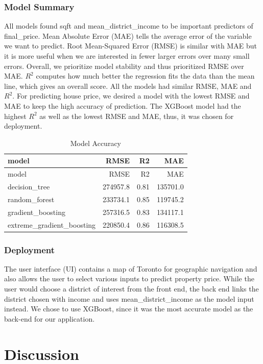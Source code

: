 \documentclass[11pt,]{article}
\begin{document}
\hypertarget{model-summary}{%
\subsubsection{Model Summary}\label{model-summary}}

All models found sqft and mean\_district\_income to be important
predictors of final\_price. Mean Absolute Error (MAE) tells the average
error of the variable we want to predict. Root Mean-Squared Error (RMSE)
is similar with MAE but it is more useful when we are interested in
fewer larger errors over many small errors. Overall, we prioritize model
stability and thus prioritized RMSE over MAE. \(R^2\) computes how much
better the regression fits the data than the mean line, which gives an
overall score. All the models had similar RMSE, MAE and \(R^2\). For
predicting house price, we desired a model with the lowest RMSE and MAE
to keep the high accuracy of prediction. The XGBoost model had the
highest \(R^2\) as well as the lowest RMSE and MAE, thus, it was chosen
for deployment.

\begin{longtable}[]{@{}lrrr@{}}
\caption{Model Accuracy}\tabularnewline
\toprule
model & RMSE & R2 & MAE\tabularnewline
\midrule
\endfirsthead
\toprule
model & RMSE & R2 & MAE\tabularnewline
\midrule
\endhead
decision\_tree & 274957.8 & 0.81 & 135701.0\tabularnewline
random\_forest & 233734.1 & 0.85 & 119745.2\tabularnewline
gradient\_boosting & 257316.5 & 0.83 & 134117.1\tabularnewline
extreme\_gradient\_boosting & 220850.4 & 0.86 & 116308.5\tabularnewline
\bottomrule
\end{longtable}

\hypertarget{deployment-1}{%
\subsubsection{Deployment}\label{deployment-1}}

The user interface (UI) contains a map of Toronto for geographic
navigation and also allows the user to select various inputs to predict
property price. While the user would choose a district of interest from
the front end, the back end links the district chosen with income and
uses mean\_district\_income as the model input instead. We chose to use
XGBoost, since it was the most accurate model as the back-end for our
application.

\hypertarget{discussion}{%
\section{Discussion}\label{discussion}}
\end{document}
